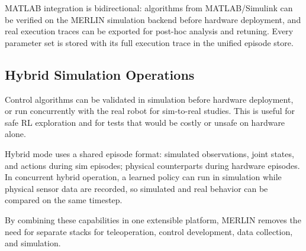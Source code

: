 \documentclass[a4paper, 10pt, conference]{ieeeconf}      %
\begin{document}
MATLAB integration is bidirectional: algorithms from MATLAB/Simulink can be verified on the MERLIN simulation backend before hardware deployment, and real execution traces can be exported for post-hoc analysis and retuning. Every parameter set is stored with its full execution trace in the unified episode store.

\subsection{Hybrid Simulation Operations}
Control algorithms can be validated in simulation before hardware deployment, or run concurrently with the real robot for sim-to-real studies. This is useful for safe RL exploration and for tests that would be costly or unsafe on hardware alone.

Hybrid mode uses a shared episode format: simulated observations, joint states, and actions during sim episodes; physical counterparts during hardware episodes. In concurrent hybrid operation, a learned policy can run in simulation while physical sensor data are recorded, so simulated and real behavior can be compared on the same timestep.

By combining these capabilities in one extensible platform, MERLIN removes the need for separate stacks for teleoperation, control development, data collection, and simulation.

\end{document}
